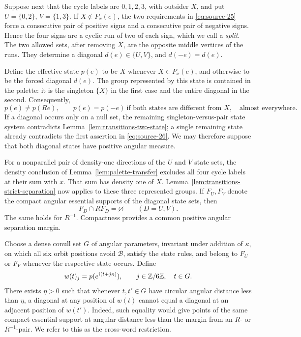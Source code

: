 Suppose next that the cycle labels are \(0,1,2,3\), with outsider
\(X\), and put \(U=\{0,2\}\), \(V=\{1,3\}\).
If \(X\notin P_x(e)\), the two requirements in
\eqref{eq:source-25} force a consecutive pair of positive signs
and a consecutive pair of negative signs.  Hence the four signs
are a cyclic run of two of each sign, which we call a
\emph{split}.  The two allowed sets, after removing \(X\), are
the opposite middle vertices of the runs.  They determine a
diagonal \(d(e)\in\{U,V\}\), and \(d(-e)=d(e)\).

Define the effective state \(p(e)\) to be \(X\) whenever
\(X\in P_x(e)\), and otherwise to be the forced diagonal
\(d(e)\).  The group represented by this state is contained
in the palette: it is the singleton \(\{X\}\) in the first
case and the entire diagonal in the second.  Consequently,
\begin{equation}\label{eq:source-26}
 p(e)\ne p(Re),\qquad
 p(e)=p(-e)\ \text{if both states are different from }X,
 \quad\text{almost everywhere}.
\end{equation}
If a diagonal occurs only on a null set, the remaining
singleton-versus-pair state system contradicts
Lemma~\ref{lem:transitions-two-state}; a single remaining state
already contradicts the first assertion in \eqref{eq:source-26}.
We may therefore suppose that both diagonal states have positive
angular measure.

For a nonparallel pair of density-one directions of the \(U\)
and \(V\) state sets, the density conclusion of
Lemma~\ref{lem:palette-transfer} excludes all four cycle labels
at their sum with \(x\).  That sum has density one of \(X\).
Lemma~\ref{lem:transitions-strict-separation} now applies to these
three represented groups.  If \(F_U,F_V\) denote the compact
angular essential supports of the diagonal state sets, then
\[
 F_D\cap RF_D=\varnothing\qquad(D=U,V).
\]
The same holds for \(R^{-1}\).  Compactness provides a common
positive angular separation margin.

Choose a dense conull set \(G\) of angular parameters, invariant
under addition of \(\kappa\), on which all six orbit positions
avoid \(\mathcal B\), satisfy the state rules, and belong to
\(F_U\) or \(F_V\) whenever the respective state occurs.  Define
\[
 w(t)_j=p(e^{i(t+j\kappa)}),\qquad j\in\mathbb Z/6\mathbb Z,
 \quad t\in G.
\]
There exists \(\eta>0\) such that whenever \(t,t'\in G\)
have circular angular distance less than \(\eta\), a diagonal
at any position of \(w(t)\) cannot equal a diagonal at an
adjacent position of \(w(t')\).  Indeed, such equality would
give points of the same compact essential support at angular
distance less than the margin from an \(R\)- or \(R^{-1}\)-pair.
We refer to this as the cross-word restriction.

